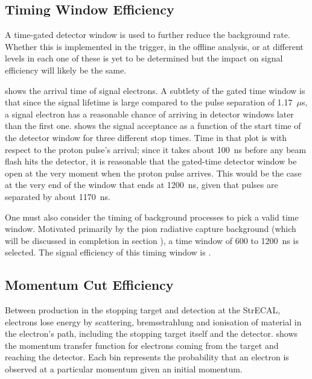 \subsection{Timing Window Efficiency}
A time-gated detector window is used to further reduce the background rate. 
Whether this is implemented in the trigger, in the offline analysis, or at different levels in each one of these is yet to be determined but the impact on signal efficiency will likely be the same.
\FigSensTiming

 shows the arrival time of signal electrons.
A subtlety of the gated time window is that since the signal lifetime is large compared to the pulse separation of 1.17~$\mu$s, a signal electron has a reasonable chance of arriving in detector windows later than the first one.
 shows the signal acceptance as a function of the start time of the detector window for three different stop times.
Time in that plot is with respect to the proton pulse's arrival; since it takes about 100~ns before any beam flash hits the detector, it is reasonable that the gated-time detector window be open at the very moment when the proton pulse arrives.
This would be the case at the very end of the window that ends at 1200~ns, given that pulses are separated by about 1170~ns.

One must also consider the timing of background processes to pick a valid time window.
Motivated primarily by the pion radiative capture background (which will be discussed in completion in section ), a time window of 600 to 1200~ns is selected.
The signal efficiency of this timing window is \VarAcceptanceTime.

\FigSensMomTransfer
\subsection{Momentum Cut Efficiency}
Between production in the stopping target and detection at the \ac{StrECAL}, electrons lose energy by scattering, bremsstrahlung and ionisation of material in the electron's path, including the stopping target itself and the detector.
 shows the momentum transfer function for electrons coming from the target and reaching the detector.
Each bin represents the probability that an electron is observed at a particular momentum given an initial momentum.
\FigSensMomSpectra

